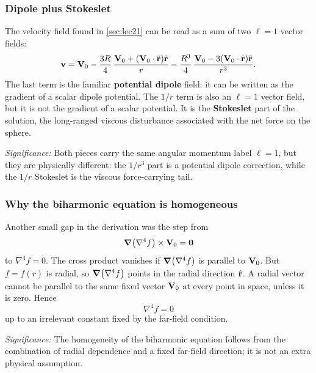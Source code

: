 \documentclass[../main.tex]{subfiles}
\begin{document}

\subsubsection*{Dipole plus Stokeslet}
The velocity field found in \cref{sec:lec21} can be read as a sum of two
$\ell=1$ vector fields:
\begin{equation}
  \mathbf{v}=\mathbf{V}_0-\frac{3R}{4}\,
  \frac{\mathbf{V}_0+(\mathbf{V}_0\cdot\hat{\mathbf{r}})\hat{\mathbf{r}}}{r}
  -\frac{R^3}{4}\,
  \frac{\mathbf{V}_0-3(\mathbf{V}_0\cdot\hat{\mathbf{r}})\hat{\mathbf{r}}}{r^3}.
  \label{eq:lec22_stokes_multipoles}
\end{equation}
The last term is the familiar \textbf{potential dipole} field: it can be written
as the gradient of a scalar dipole potential. The $1/r$ term is also an
$\ell=1$ vector field, but it is not the gradient of a scalar potential. It is
the \textbf{Stokeslet} part of the solution, the long-ranged viscous disturbance
associated with the net force on the sphere.

\textit{Significance:} Both pieces carry the same angular momentum label
$\ell=1$, but they are physically different: the $1/r^3$ part is a potential
dipole correction, while the $1/r$ Stokeslet is the viscous force-carrying tail.

\subsubsection*{Why the biharmonic equation is homogeneous}
Another small gap in the derivation was the step from
\[
  \grad(\nabla^4 f)\times\mathbf{V}_0=\mathbf{0}
\]
to $\nabla^4 f=0$. The cross product vanishes if
$\grad(\nabla^4 f)$ is parallel to $\mathbf{V}_0$. But $f=f(r)$ is radial, so
$\grad(\nabla^4 f)$ points in the radial direction $\hat{\mathbf{r}}$. A radial vector
cannot be parallel to the same fixed vector $\mathbf{V}_0$ at every point in space,
unless it is zero. Hence
\begin{equation}
  \boxed{\;\nabla^4 f=0\;}
  \label{eq:lec22_biharmonic_homogeneous}
\end{equation}
up to an irrelevant constant fixed by the far-field condition.

\textit{Significance:} The homogeneity of the biharmonic equation follows from
the combination of radial dependence and a fixed far-field direction; it is not
an extra physical assumption.
\end{document}
